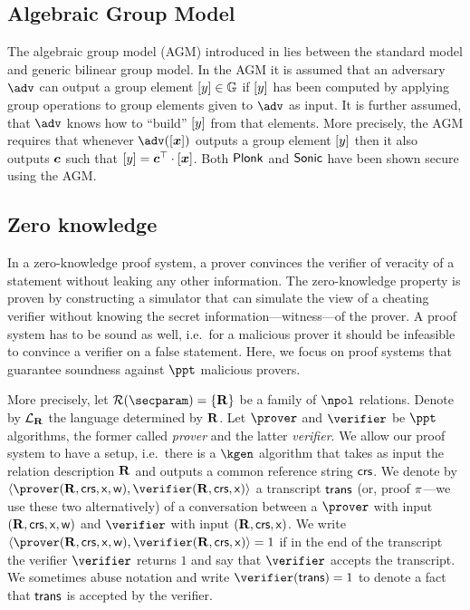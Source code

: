 \let\accentvec\vec \documentclass[runningheads,10pt]{llncs}
\def\vec#1{\mathchoice{\mbox{\boldmath$\displaystyle#1$}}
{\mbox{\boldmath$\textstyle#1$}} {\mbox{\boldmath$\scriptstyle#1$}}
{\mbox{\boldmath$\scriptscriptstyle#1$}}}
\begin{document}
\subsection{Algebraic Group Model}
The algebraic group model (AGM) introduced in \cite{C:FucKilLos18} lies
between the standard model and generic bilinear group model. In the AGM it is
assumed that an adversary $\adv$ can output a group element $\left[y\right] \in
\mathbb{G}$ if $\left[y\right]$ has been computed by applying group operations to group
elements given to $\adv$ as input. It is further assumed, that $\adv$ knows
how to ``build'' $\left[y\right]$ from that elements. More precisely, the AGM
requires that whenever $\adv(\gnone{\vec{x}})$ outputs a group element
$\left[y\right]$ then it also outputs $\vec{c}$ such that $\gnone{y} = \vec{c}^\top
\cdot \gnone{\vec{x}}$. Both $\textnormal{\textsf{Plonk}}$ and ${\textnormal{\textsf{Sonic}}}$
have been shown secure using the AGM. 

\subsection{Zero knowledge}
In a zero-knowledge proof system, a prover convinces the verifier of
 veracity of a statement without leaking any other information. 
The zero-knowledge property is proven by constructing a simulator that can
simulate the view of a cheating verifier without knowing the secret
information---witness---of the prover.
 A proof system
 has to be sound as well, i.e.~for a malicious prover it should be infeasible
 to convince a verifier on a false statement.
Here, we focus on proof systems that guarantee soundness against $\ppt$
malicious provers.

More precisely, let $\RELGEN(\secparam) = \smallset{\REL}$ be a family of
$\npol$ relations.
Denote by $\mathcal{L}_{\mathbf{R}}$ the language determined by $\mathbf{R}$.
Let $\prover$ and $\verifier$ be $\ppt$ algorithms, the former called \emph{prover}
and the latter \emph{verifier}. We allow our proof system to have a setup,
i.e.~there is a $\kgen$ algorithm that takes as input the relation
description $\mathbf{R}$ and
outputs a common reference string $\mathsf{crs}$.
We denote by $\ip{\prover(\REL, \crs, \inp, \wit)}{\verifier(\REL,
\crs,\inp)}$ a transcript $\mathsf{trans}$ (or, proof $\pi$---we use these two
alternatively) of a conversation between a $\prover$ with input
$(\mathbf{R}, \mathsf{crs}, \mathsf{x}, \mathsf{w})$ and $\verifier$ with input $(\mathbf{R}, \mathsf{crs}, \mathsf{x})$.
We write $\ip{\prover (\REL, \crs, \inp, \wit)}{\verifier(\REL, \crs, \inp)} =
1$ if in the end of the transcript the verifier $\verifier$ returns $1$ and
say that $\verifier$ accepts the transcript. We sometimes abuse notation and
write $\verifier(\trans) = 1$ to denote a fact that $\mathsf{trans}$ is accepted by
the verifier. 
\end{document}
